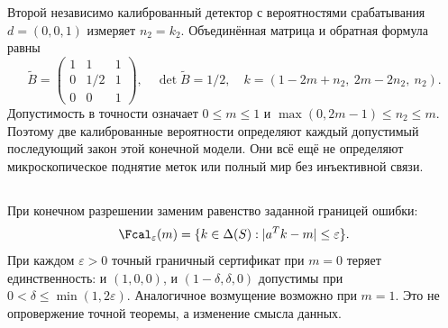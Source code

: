 {Второй независимо калиброванный детектор с вероятностями срабатывания $d=(0,0,1)$ измеряет $n_2=k_2$. Объединённая матрица и обратная формула равны}
\begin{equation}\label{eq:second}
 \widetilde B=\begin{pmatrix}1&1&1\\0&1/2&1\\0&0&1\end{pmatrix},\quad
 \det\widetilde B=1/2,\quad
 k=(1-2m+n_2,\ 2m-2n_2,\ n_2).
\end{equation}
{Допустимость в точности означает $0\leq m\leq1$ и $\max(0,2m-1)\leq n_2\leq m$. Поэтому две калиброванные вероятности определяют каждый допустимый последующий закон этой конечной модели. Они всё ещё не определяют микроскопическое поднятие меток или полный мир без инъективной связи.}

\subsection{}
{При конечном разрешении заменим равенство заданной границей ошибки:}
\begin{equation}\label{eq:resolution}
 \Fcal_\varepsilon(m)=\{k\in\Delta(S):|a^Tk-m|\leq\varepsilon\}.
\end{equation}
{При каждом $\varepsilon>0$ точный граничный сертификат при $m=0$ теряет единственность: и $(1,0,0)$, и $(1-\delta,\delta,0)$ допустимы при $0<\delta\leq\min(1,2\varepsilon)$. Аналогичное возмущение возможно при $m=1$. Это не опровержение точной теоремы, а изменение смысла данных.}

